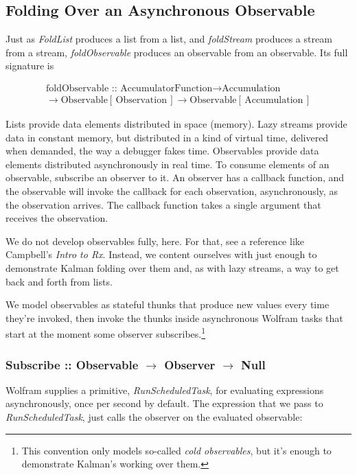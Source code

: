 \documentclass[10pt,oneside,x11names]{article}
\begin{document}
\subsection{Folding Over an Asynchronous Observable}
\label{sec:orgheadline15}

Just as \emph{FoldList} produces a list from a list, and \emph{foldStream} produces a
stream from a stream, \emph{foldObservable} produces an observable from an
observable. Its full signature is

\begin{align*}
\text{foldObservable :: }
\text{AccumulatorFunction}
\rightarrow
\text{Accumulation}\\
\rightarrow
\text{Observable}\left[\,\text{Observation}\,\right]
\rightarrow
\text{Observable}\left[\,\text{Accumulation}\,\right]
\end{align*}

Lists provide data elements distributed in space (memory). Lazy streams provide
data in constant memory, but distributed in a kind of virtual time, delivered
when demanded, the way a debugger fakes time. Observables provide data elements
distributed asynchronously in real time. To consume elements of an observable,
subscribe an observer to it. An observer has a callback function, and the
observable will invoke the callback for each observation, asynchronously, as the
observation arrives. The callback function takes a single argument that receives
the observation.

We do not develop observables fully, here. For that, see a reference like
Campbell's \emph{Intro to Rx}.\footnotemark[5]{} Instead, we content ourselves with just
enough to demonstrate Kalman folding over them and, as with lazy streams, a way
to get back and forth from lists.

We model observables as stateful thunks that produce new values every time
they're invoked, then invoke the thunks inside asynchronous Wolfram tasks that
start at the moment some observer subscribes.\footnote{This convention only models so-called \emph{cold observables}, but it's enough to demonstrate Kalman's working over them.}

\subsubsection{Subscribe :: Observable \(\rightarrow\) Observer \(\rightarrow\) Null}
\label{sec:orgheadline10}

Wolfram supplies a primitive, \emph{RunScheduledTask}, for evaluating expressions
asynchronously, once per second by default. The expression that we pass to
\emph{RunScheduledTask}, just calls the observer on the evaluated observable:
\end{document}
